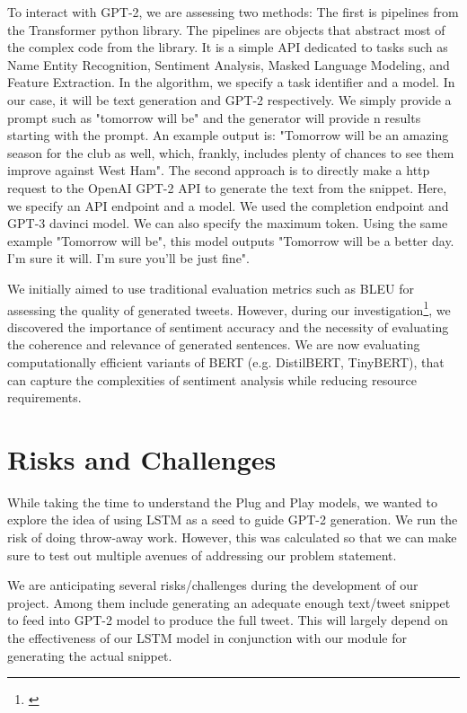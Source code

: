\documentclass[12pt]{article}
\begin{document}
To interact with GPT-2, we are assessing two methods:
The first is pipelines from the Transformer python library. The pipelines are objects that abstract most of the complex code from the library. It is a simple API dedicated to tasks such as Name Entity Recognition, Sentiment Analysis, Masked Language Modeling, and Feature Extraction. In the algorithm, we specify a task identifier and a model. In our case, it will be text generation and GPT-2 respectively. We simply provide a prompt such as "tomorrow will be" and the generator will provide n results starting with the prompt. An example output is: "Tomorrow will be an amazing season for the club as well, which, frankly, includes plenty of chances to see them improve against West Ham". 
The second approach is to directly make a http request to the OpenAI GPT-2 API to generate the text from the snippet. Here, we specify an API endpoint and a model. We used the completion endpoint and GPT-3 davinci model. We can also specify the maximum token. Using the same example "Tomorrow will be", this model outputs "Tomorrow will be a better day. I'm sure it will. I'm sure you'll be just fine".

We initially aimed to use traditional evaluation metrics such as BLEU for assessing the quality of generated tweets. However, during our investigation\footnote{\citep{leiter2022explainable}}, we discovered the importance of sentiment accuracy and the necessity of evaluating the coherence and relevance of generated sentences. We are now evaluating computationally efficient variants of BERT (e.g. DistilBERT, TinyBERT), that can capture the complexities of sentiment analysis while reducing resource requirements.

\section{Risks and Challenges}
While taking the time to understand the Plug and Play models, we wanted to explore the idea of using LSTM as a seed to guide GPT-2 generation.  We run the risk of doing throw-away work.  However, this was calculated so that we can make sure to test out multiple avenues of addressing our problem statement.

We are anticipating several risks/challenges during the development of our project. Among them include generating an adequate enough text/tweet snippet to feed into GPT-2 model to produce the full tweet. This will largely depend on the effectiveness of our LSTM model in conjunction with our module for generating the actual snippet.
\end{document}
